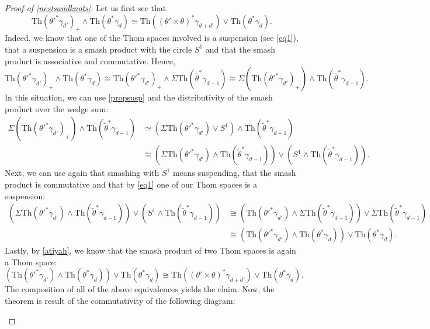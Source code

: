 \documentclass[a4paper, 11pt,reqno]{amsart}
\theoremstyle{plain}
\theoremstyle{definition}
\newcommand{\Th}{\mathrm{Th}}
\begin{document}
\begin{proof}[Proof of \cref{nestsandknots}] 
Let us first see that 
\begin{equation}\label{eqq}
{\Th(\theta'^\ast\gamma_{d'})}_+\wedge \Th(\theta^\ast\gamma_{d})\simeq\Th((\theta'\times\theta)^\ast\gamma_{d+d'})\vee\Th(\theta^\ast\gamma_{d}).\end{equation}
Indeed, we know that one of the Thom spaces involved is a suspension (see \eqref{eq1}), that a suspension is a smash product with the circle $S^1$ and that the smash product is associative and commutative. Hence, 
\[{\Th(\theta'^\ast\gamma_{d'})}_+\wedge \Th(\theta^\ast\gamma_{d})\cong{\Th(\theta'^\ast\gamma_{d'})}_+\wedge \Sigma\Th(\widetilde{\theta}^\ast\gamma_{d-1})\cong \Sigma({\Th(\theta'^\ast\gamma_{d'})}_+)\wedge \Th(\widetilde{\theta}^\ast\gamma_{d-1}).\]
In this situation, we can use \cref{propsusp} and the distributivity of the smash product over the wedge sum:
\begin{align*}
\Sigma({\Th(\theta'^\ast\gamma_{d'})}_+)\wedge \Th(\widetilde{\theta}^\ast\gamma_{d-1})&\simeq(\Sigma\Th(\theta'^\ast\gamma_{d'})\vee S^1)\wedge\Th(\widetilde{\theta}^\ast\gamma_{d-1})\\
    &\cong (\Sigma\Th(\theta'^\ast\gamma_{d'})\wedge\Th(\widetilde{\theta}^\ast\gamma_{d-1}))\vee (S^1\wedge \Th(\widetilde{\theta}^\ast\gamma_{d-1})).
\end{align*}
Next, we can use again that smashing with $S^1$ means suspending, that the smash product is commutative and that by \eqref{eq1} one of our Thom spaces is a suspension: 
\begin{align*} (\Sigma\Th(\theta'^\ast\gamma_{d'})\wedge\Th(\widetilde{\theta}^\ast\gamma_{d-1}))\vee (S^1\wedge \Th(\widetilde{\theta}^\ast\gamma_{d-1}))    &\cong (\Th(\theta'^\ast\gamma_{d'})\wedge\Sigma\Th(\widetilde{\theta}^\ast\gamma_{d-1}))\vee \Sigma\Th(\widetilde{\theta}^\ast\gamma_{d-1})\\
    &\cong(\Th(\theta'^\ast\gamma_{d'})\wedge\Th(\theta^\ast\gamma_{d}))\vee \Th(\theta^\ast\gamma_{d}).
\end{align*}
Lastly, by \cref{atiyah}, we know that the smash product of two Thom spaces is again a Thom space:
\[(\Th(\theta'^\ast\gamma_{d'})\wedge\Th(\theta^\ast\gamma_{d}))\vee \Th(\theta^\ast\gamma_{d})\cong\Th((\theta'\times\theta)^\ast\gamma_{d+d'})\vee\Th(\theta^\ast\gamma_d).\]
The composition of all of the above equivalences yields the claim. Now, the theorem is result of the commutativity of the following diagram:
\begin{center}

\end{center}
\end{proof}
\end{document}
